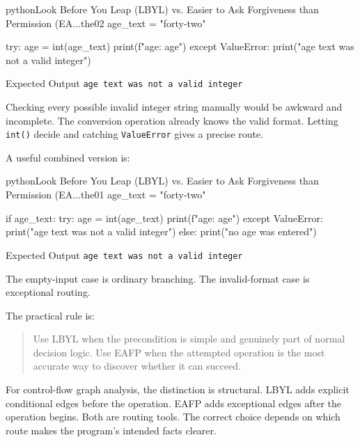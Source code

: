 \begin{codebox}[]{python}{Look Before You Leap (LBYL) vs. Easier to Ask Forgiveness than Permission (EA...}{the02}
age_text = "forty-two"

try:
    age = int(age_text)
    print(f"age: {age}")
except ValueError:
    print("age text was not a valid integer")
\end{codebox}


\begin{iobox}{Expected Output}
\texttt{age text was not a valid integer} \\
\end{iobox}


Checking every possible invalid integer string manually would be awkward and incomplete. The conversion operation already knows the valid format. Letting \texttt{int()} decide and catching \texttt{ValueError} gives a precise route.

A useful combined version is:

\begin{codebox}[]{python}{Look Before You Leap (LBYL) vs. Easier to Ask Forgiveness than Permission (EA...}{the01}
age_text = "forty-two"

if age_text:
    try:
        age = int(age_text)
        print(f"age: {age}")
    except ValueError:
        print("age text was not a valid integer")
else:
    print("no age was entered")
\end{codebox}


\begin{iobox}{Expected Output}
\texttt{age text was not a valid integer} \\
\end{iobox}


The empty-input case is ordinary branching. The invalid-format case is exceptional routing.

The practical rule is:

\begin{quote}
Use LBYL when the precondition is simple and genuinely part of normal decision logic. Use EAFP when the attempted operation is the most accurate way to discover whether it can succeed.
\end{quote}

For control-flow graph analysis, the distinction is structural. LBYL adds explicit conditional edges before the operation. EAFP adds exceptional edges after the operation begins. Both are routing tools. The correct choice depends on which route makes the program's intended facts clearer.